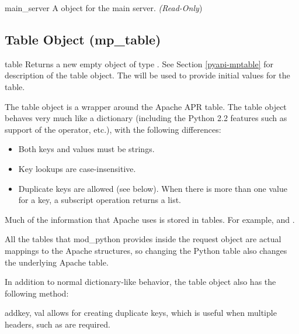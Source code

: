 \begin{memberdesc}[apache]{main_server}
  A  object for the main server.
  \emph{(Read-Only})
\end{memberdesc}

\subsection{Table Object (mp_table)\label{pyapi-mptable}}

\begin{classdesc}{table}{}
  Returns a new empty object of type . See Section
  \ref{pyapi-mptable} for description of the table object. The
   will be used to provide initial values for
  the table.  

  The table object is a wrapper around the Apache APR table. The table
  object behaves very much like a dictionary (including the Python 2.2
  features such as support of the  operator, etc.), with the 
  following differences:

  \begin{itemize}
  \item
    Both keys and values must be strings.
  \item
    Key lookups are case-insensitive.
  \item
    Duplicate keys are allowed (see  below). When there is
    more than one value for a key, a subscript operation returns a list.
  \end{itemize}

  Much of the information that Apache uses is stored in tables. For
  example,  and .

  All the tables that mod_python provides inside the request
  object are actual mappings to the Apache structures, so changing the
  Python table also changes the underlying Apache table.

  In addition to normal dictionary-like behavior, the table object also
  has the following method:

  \begin{methoddesc}[table]{add}{key, val}
     allows for creating duplicate keys, which is useful 
    when multiple headers, such as  are required.
  \end{methoddesc}

\end{classdesc}

